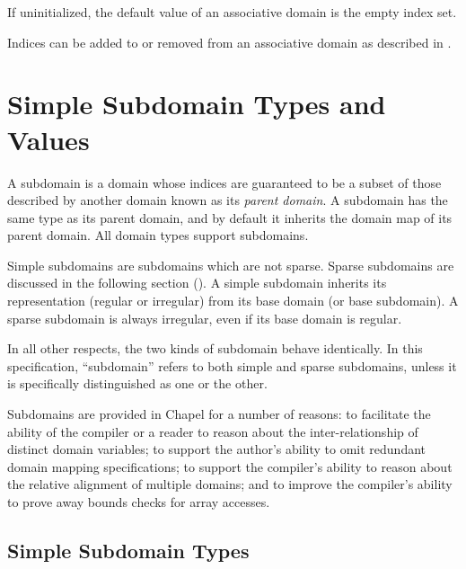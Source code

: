 
If uninitialized, the default value of an associative domain is the
empty index set.

Indices can be added to or removed from an associative domain
as described in .


\section{Simple Subdomain Types and Values}
\label{Simple_Subdomain_Types_and_Values}

A subdomain is a domain whose indices are guaranteed to be a subset of
those described by another domain known as its \emph{parent domain}.
A subdomain has the same type as its parent domain, and by default
it inherits the domain map of its parent domain.  All domain types
support subdomains.

Simple subdomains are subdomains which are not sparse.  Sparse
subdomains are discussed in the following section
().  A simple subdomain
inherits its representation (regular or irregular) from its base
domain (or base subdomain).  A sparse subdomain is always irregular,
even if its base domain is regular.

In all other respects, the two kinds of subdomain behave identically.  In this
specification, ``subdomain'' refers to both simple and sparse subdomains, unless
it is specifically distinguished as one or the other.

\begin{rationale}
Subdomains are provided in Chapel for a number of reasons: to
facilitate the ability of the compiler or a reader to reason about the
inter-relationship of distinct domain variables; to support the
author's ability to omit redundant domain mapping specifications; to
support the compiler's ability to reason about the relative alignment
of multiple domains; and to improve the compiler's ability to prove
away bounds checks for array accesses.
\end{rationale}

\subsection{Simple Subdomain Types}
\label{Simple_Subdomain_Types}

